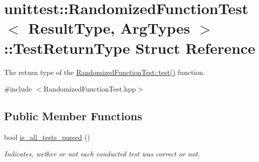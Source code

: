 \hypertarget{structunittest_1_1_randomized_function_test_1_1_test_return_type}{}\section{unittest\+:\+:Randomized\+Function\+Test$<$ Result\+Type, Arg\+Types $>$\+:\+:Test\+Return\+Type Struct Reference}
\label{structunittest_1_1_randomized_function_test_1_1_test_return_type}


The return type of the \hyperlink{classunittest_1_1_randomized_function_test_a7e4f4b28b4487e4cdd445faf4f4b0ca5}{Randomized\+Function\+Test\+::test()} function.  




{\ttfamily \#include $<$Randomized\+Function\+Test.\+hpp$>$}

\subsection*{Public Member Functions}
\begin{DoxyCompactItemize}
\item 
bool \hyperlink{structunittest_1_1_randomized_function_test_1_1_test_return_type_a197fb8ecb9eea76dfb418ad8e58f5a9b}{is\+\_\+all\+\_\+tests\+\_\+passed} ()\hypertarget{structunittest_1_1_randomized_function_test_1_1_test_return_type_a197fb8ecb9eea76dfb418ad8e58f5a9b}{}\label{structunittest_1_1_randomized_function_test_1_1_test_return_type_a197fb8ecb9eea76dfb418ad8e58f5a9b}

\begin{DoxyCompactList}\small\item\em Indicates, wether or not each conducted test was correct or not. \end{DoxyCompactList}\end{DoxyCompactItemize}
